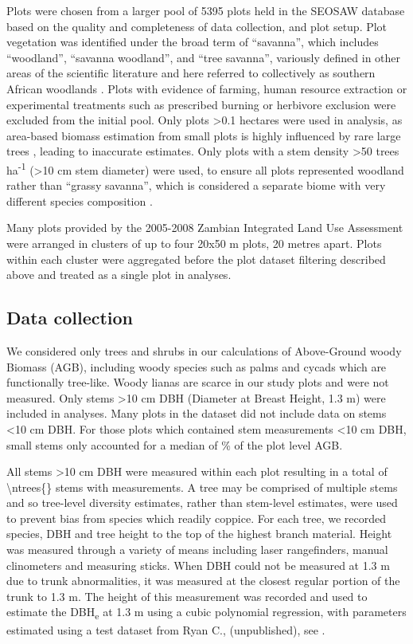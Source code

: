 \documentclass[11pt,a4paper]{article}
\begin{document}
Plots were chosen from a larger pool of 5395 plots held in the SEOSAW database \citep{seosaw_web} based on the quality and completeness of data collection, and plot setup. Plot vegetation was identified under the broad term of ``savanna'', which includes ``woodland'', ``savanna woodland'', and ``tree savanna'', variously defined in other areas of the scientific literature and here referred to collectively as southern African woodlands \citep{Ratnam2011, Hill2010}. Plots with evidence of farming, human resource extraction or experimental treatments such as prescribed burning or herbivore exclusion were excluded from the initial pool. Only plots >0.1 hectares were used in analysis, as area-based biomass estimation from small plots is highly influenced by rare large trees \citep{Stegen2011}, leading to inaccurate estimates. Only plots with a stem density >50 trees ha\textsuperscript{-1} (>10 cm stem diameter) were used, to ensure all plots represented woodland rather than ``grassy savanna'', which is considered a separate biome with very different species composition \citep{Parr2014}. 

Many plots provided by the 2005-2008 Zambian Integrated Land Use Assessment \citep{Mukosha2009} were arranged in clusters of up to four 20x50 m plots, 20 metres apart. Plots within each cluster were aggregated before the plot dataset filtering described above and treated as a single plot in analyses.

\subsection{Data collection}
 
We considered only trees and shrubs in our calculations of Above-Ground woody Biomass (AGB), including woody species such as palms and cycads which are functionally tree-like. Woody lianas are scarce in our study plots and were not measured. Only stems >10 cm DBH (Diameter at Breast Height, 1.3 m) were included in analyses. Many plots in the dataset did not include data on stems <10 cm DBH. For those plots which contained stem measurements <10 cm DBH, small stems only accounted for a median of \percsmallagb{}\% of the plot level AGB. 

All stems >10 cm DBH were measured within each plot resulting in a total of \num[group-separator={,}]{\ntrees{}} stems with measurements. A tree may be comprised of multiple stems and so tree-level diversity estimates, rather than stem-level estimates, were used to prevent bias from species which readily coppice. For each tree, we recorded species, DBH and tree height to the top of the highest branch material. Height was measured through a variety of means including laser rangefinders, manual clinometers and measuring sticks. When DBH could not be measured at 1.3 m due to trunk abnormalities, it was measured at the closest regular portion of the trunk to 1.3 m. The height of this measurement was recorded and used to estimate the DBH\textsubscript{e} at 1.3 m using a cubic polynomial regression, with parameters estimated using a test dataset from Ryan C., (unpublished), see \citet{Godlee2020}.
\end{document}
